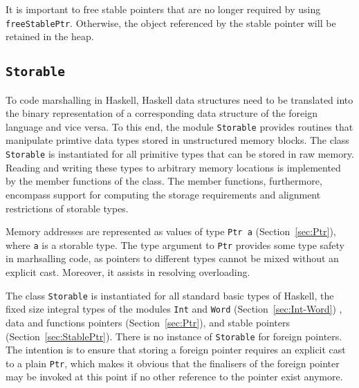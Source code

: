 \documentclass[a4paper,twosides]{article}
\newcommand{\code}[1]{\texttt{#1}}      %
\begin{document}
It is important to free stable pointers that are no longer required by using
\code{freeStablePtr}.  Otherwise, the object referenced by the stable pointer
will be retained in the heap.


\subsection{\code{Storable}}
\label{sec:Storable}

To code marshalling in Haskell, Haskell data structures need to be translated
into the binary representation of a corresponding data structure of the
foreign language and vice versa.  To this end, the module \code{Storable}
provides routines that manipulate primtive data types stored in unstructured
memory blocks.  The class \code{Storable} is instantiated for all primitive
types that can be stored in raw memory.  Reading and writing these types to
arbitrary memory locations is implemented by the member functions of the
class.  The member functions, furthermore, encompass support for computing the
storage requirements and alignment restrictions of storable types.

Memory addresses are represented as values of type \code{Ptr a}
(Section~\ref{sec:Ptr}), where \code{a} is a storable type.  The type argument
to \code{Ptr} provides some type safety in marhsalling code, as pointers to
different types cannot be mixed without an explicit cast.  Moreover, it
assists in resolving overloading.

The class \code{Storable} is instantiated for all standard basic types of
Haskell, the fixed size integral types of the modules \code{Int} and
\code{Word} (Section~\ref{sec:Int-Word}) , data and functions pointers
(Section~\ref{sec:Ptr}), and stable pointers (Section~\ref{sec:StablePtr}).
There is no instance of \code{Storable} for foreign pointers.  The intention
is to ensure that storing a foreign pointer requires an explicit cast to a
plain \code{Ptr}, which makes it obvious that the finalisers of the foreign
pointer may be invoked at this point if no other reference to the pointer
exist anymore.
\end{document}
